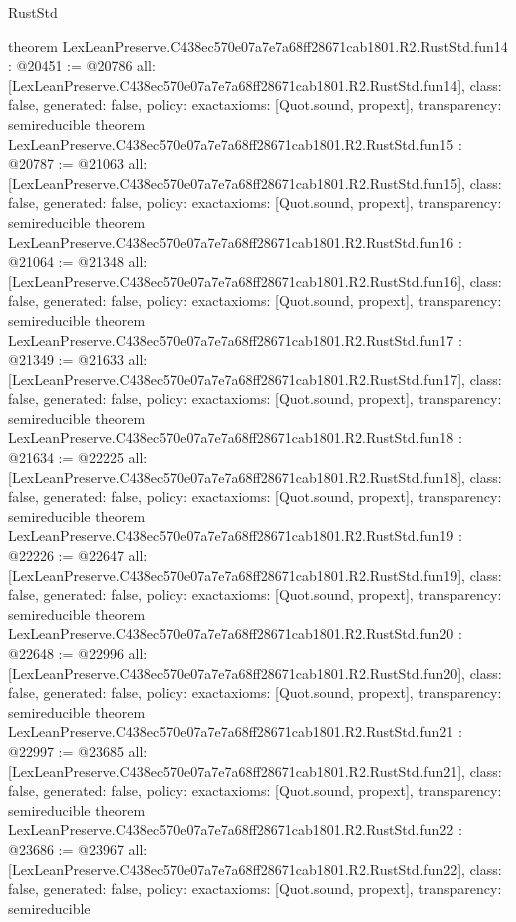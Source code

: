 \begin{lexlean}{RustStd}
\begin{coremodule}
{}
theorem LexLeanPreserve.C438ec570e07a7e7a68ff28671cab1801.R2.RustStd.fun14 : @20451 := @20786 {
  all: [LexLeanPreserve.C438ec570e07a7e7a68ff28671cab1801.R2.RustStd.fun14],
  class: false,
  generated: false,
  policy: exact{axioms: [Quot.sound, propext]},
  transparency: semireducible
}
theorem LexLeanPreserve.C438ec570e07a7e7a68ff28671cab1801.R2.RustStd.fun15 : @20787 := @21063 {
  all: [LexLeanPreserve.C438ec570e07a7e7a68ff28671cab1801.R2.RustStd.fun15],
  class: false,
  generated: false,
  policy: exact{axioms: [Quot.sound, propext]},
  transparency: semireducible
}
theorem LexLeanPreserve.C438ec570e07a7e7a68ff28671cab1801.R2.RustStd.fun16 : @21064 := @21348 {
  all: [LexLeanPreserve.C438ec570e07a7e7a68ff28671cab1801.R2.RustStd.fun16],
  class: false,
  generated: false,
  policy: exact{axioms: [Quot.sound, propext]},
  transparency: semireducible
}
theorem LexLeanPreserve.C438ec570e07a7e7a68ff28671cab1801.R2.RustStd.fun17 : @21349 := @21633 {
  all: [LexLeanPreserve.C438ec570e07a7e7a68ff28671cab1801.R2.RustStd.fun17],
  class: false,
  generated: false,
  policy: exact{axioms: [Quot.sound, propext]},
  transparency: semireducible
}
theorem LexLeanPreserve.C438ec570e07a7e7a68ff28671cab1801.R2.RustStd.fun18 : @21634 := @22225 {
  all: [LexLeanPreserve.C438ec570e07a7e7a68ff28671cab1801.R2.RustStd.fun18],
  class: false,
  generated: false,
  policy: exact{axioms: [Quot.sound, propext]},
  transparency: semireducible
}
theorem LexLeanPreserve.C438ec570e07a7e7a68ff28671cab1801.R2.RustStd.fun19 : @22226 := @22647 {
  all: [LexLeanPreserve.C438ec570e07a7e7a68ff28671cab1801.R2.RustStd.fun19],
  class: false,
  generated: false,
  policy: exact{axioms: [Quot.sound, propext]},
  transparency: semireducible
}
theorem LexLeanPreserve.C438ec570e07a7e7a68ff28671cab1801.R2.RustStd.fun20 : @22648 := @22996 {
  all: [LexLeanPreserve.C438ec570e07a7e7a68ff28671cab1801.R2.RustStd.fun20],
  class: false,
  generated: false,
  policy: exact{axioms: [Quot.sound, propext]},
  transparency: semireducible
}
theorem LexLeanPreserve.C438ec570e07a7e7a68ff28671cab1801.R2.RustStd.fun21 : @22997 := @23685 {
  all: [LexLeanPreserve.C438ec570e07a7e7a68ff28671cab1801.R2.RustStd.fun21],
  class: false,
  generated: false,
  policy: exact{axioms: [Quot.sound, propext]},
  transparency: semireducible
}
theorem LexLeanPreserve.C438ec570e07a7e7a68ff28671cab1801.R2.RustStd.fun22 : @23686 := @23967 {
  all: [LexLeanPreserve.C438ec570e07a7e7a68ff28671cab1801.R2.RustStd.fun22],
  class: false,
  generated: false,
  policy: exact{axioms: [Quot.sound, propext]},
  transparency: semireducible
}
\end{coremodule}
\end{lexlean}
